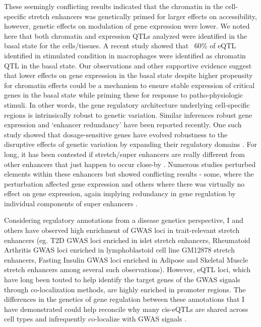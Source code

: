 These seemingly conflicting results indicated that the chromatin in the cell-specific stretch enhancers was genetically primed for larger effects on accessibility, however, genetic effects on modulation of gene expression were lower. We noted here that both chromatin and expression QTLs analyzed were identified in the basal state for the cells/tissues. A recent study showed that ~60\% of eQTL identified in stimulated condition in macrophages were identified as chromatin QTL in the basal state. Our observations and other supportive evidence suggest that lower effects on gene expression in the basal state despite higher propensity for chromatin effects could be a mechanism to ensure stable expression of critical genes in the basal state while priming these for response to patho-physiologic stimuli. In other words, the gene regulatory architecture underlying cell-specific regions is intrinsically robust to genetic variation. Similar inferences robust gene expression and ‘enhancer redundancy’ have been reported recently. One such study showed that dosage-sensitive genes have evolved robustness to the disruptive effects of genetic variation by expanding their regulatory domains \cite{wangEnhancerRedundancyPredicts2018}. For long, it has been contested if stretch/super enhancers are really different from other enhancers that just happen to occur close-by \cite{pottWhatAreSuperenhancers2015}. Numerous studies perturbed elements within these enhancers but showed conflicting results - some, where the perturbation affected gene expression and others where there was virtually no effect on gene expression, again implying redundancy in gene regulation by individual components of super enhancers \cite{hayGeneticDissectionAglobin2016, shinHierarchyMammarySTAT5driven2016, moorthyEnhancersSuperenhancersHave2017, xieMultiplexedEngineeringAnalysis2017}. 


Considering regulatory annotations from a disease genetics perspective, I and others have observed high enrichment of GWAS loci in trait-relevant stretch enhancers (eg. T2D GWAS loci enriched in islet stretch enhancers, Rheumatoid Arthritis GWAS loci enriched in lymphoblastoid cell line GM12878 stretch enhancers, Fasting Insulin GWAS loci enriched in Adipose and Skeletal Muscle stretch enhancers among several such observations). However, eQTL loci, which have long been touted to help identify the target genes of the GWAS signals through co-localization methods, are highly enriched in promoter regions. The differences in the genetics of gene regulation between these annotations that I have demonstrated could help reconcile why many cis-eQTLs are shared across cell types and infrequently co-localize with GWAS signals \cite{liuFunctionalArchitecturesLocal2017, huangFinemappingInflammatoryBowel2017, gtexconsortiumGeneticEffectsGene2017}. 


